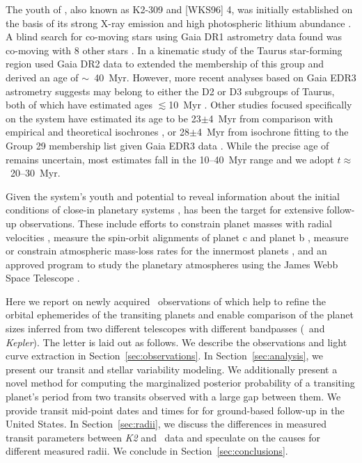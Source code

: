 \documentclass[twocolumn]{aastex631}
\begin{document}
The youth of \sname, also known as K2-309 and [WKS96] 4, was initially established on the basis of its strong X-ray emission \citep{Wichmann1996} and high photospheric lithium abundance \citep{Wichmann2000}. A blind search for co-moving stars using Gaia DR1 astrometry data found \sname was co-moving with 8 other stars \citep[Group 29 in][]{Oh2017}. In a kinematic study of the Taurus star-forming region \citet{Luhman2018} used Gaia DR2 data to extended the membership of this group and derived an age of $\sim$~40~Myr. However, more recent analyses based on Gaia EDR3 astrometry suggests \sname may belong to either the D2 or D3 subgroups of Taurus, both of which have estimated ages $\lesssim$10~Myr \citep{gaidos21, Krolikowski2021}. Other studies focused specifically on the \sname system have estimated its age to be 23$\pm$4~Myr from comparison with empirical and theoretical isochrones \citep{David2019b}, or 28$\pm$4~Myr from isochrone fitting to the \citet{Luhman2018} Group 29 membership list given Gaia EDR3 data \citep{johnson21}. While the precise age of \sname remains uncertain, most estimates fall in the 10--40~Myr range and we adopt $t \approx$~20--30~Myr.

Given the system's youth and potential to reveal information about the initial conditions of close-in planetary systems \citep[e.g.][]{Poppenhaeger2021, Owen2020}, \sname has been the target for extensive follow-up observations. These include efforts to constrain planet masses with radial velocities \citep{Beichman2019}, measure the spin-orbit alignments of planet c \citep{Feinstein21} and planet b \citep{johnson21, gaidos21}, measure or constrain atmospheric mass-loss rates for the innermost planets \citep{Schlawin21, Vissapragada21}, and an approved program to study the planetary atmospheres using the James Webb Space Telescope \citep{Desert2021}.

Here we report on newly acquired \tess\ observations of \sname which help to refine the orbital ephemerides of the transiting planets and enable comparison of the planet sizes inferred from two different telescopes with different bandpasses (\tess\ and \textit{Kepler}). The letter is laid out as follows. We describe the observations and light curve extraction in Section~\ref{sec:observations}. In Section~\ref{sec:analysis}, we present our transit and stellar variability modeling. We additionally present a novel method for computing the marginalized posterior probability of a transiting planet's period from two transits observed with a large gap between them. We provide transit mid-point dates and times for \planete for ground-based follow-up in the United States. In Section~\ref{sec:radii}, we discuss the differences in measured transit parameters between \textit{K2} and \tess\ data and speculate on the causes for different measured radii. We conclude in Section~\ref{sec:conclusions}.
\end{document}
